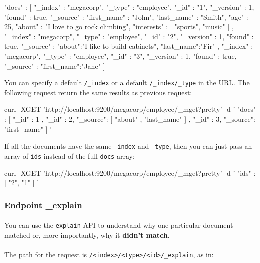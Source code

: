 \documentclass{article}%
\begin{document}
\begin{command}
{
	"docs" : [ {
		"_index" : "megacorp",
		"_type" : "employee",
		"_id" : "1",
		"_version" : 1,
		"found" : true,
		"_source" : {
			"first_name" : "John",
			"last_name"  : "Smith",
			"age"        : 25,
			"about"      : "I love to go rock climbing",
			"interests"  : [ "sports", "music" ]
		}
	}, {
		"_index" : "megacorp",
		"_type" : "employee",
		"_id" : "2",
		"_version" : 1,
		"found" : true,
		"_source" : {
			"about":"I like to build cabinets",
			"last_name":"Fir"
		}
	}, {
		"_index" : "megacorp",
		"_type" : "employee",
		"_id" : "3",
		"_version" : 1,
		"found" : true,
		"_source" : {
			"first_name":"Jane"
		}
  } ]
}
\end{command}

You can specify a default \texttt{/\_index} or a default \texttt{/\_index/\_type} in the URL. The following request return the same results as previous request:

\begin{command}
curl -XGET 'http://localhost:9200/megacorp/employee/_mget?pretty' -d '
{
	"docs" : [
		{
			"_id" : 1
		},
		{
			"_id" : 2,
			"_source": [ "about" , "last_name" ]
		},
		{
			"_id" : 3,
			"_source": "first_name"
		}
	]
}'
\end{command}

If all the documents have the same \texttt{\_index} and \texttt{\_type}, then you can just pass an array of \texttt{ids} instead of the full \texttt{docs} array:

\begin{command}
curl -XGET 'http://localhost:9200/megacorp/employee/_mget?pretty' -d '
{
	"ids" : [ "2", "1" ]
}'
\end{command}

\subsubsection{Endpoint \_explain}

\paragraph{} You can use the \texttt{explain} API to understand why one particular document matched or, more importantly, why it \textbf{didn’t match}.

\paragraph{} The path for the request is \texttt{/<index>/<type>/<id>/\_explain}, as in:
\end{document}
